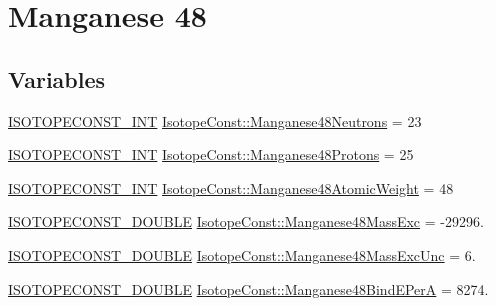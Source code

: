 \hypertarget{group___isotope_const-_manganese-_mn48}{}\section{Manganese 48}
\label{group___isotope_const-_manganese-_mn48}
\subsection*{Variables}
\begin{DoxyCompactItemize}
\item 
\mbox{\hyperlink{group___isotope_const-_macros_ga5f18360b3e99483a35c32d789e62621c}{I\+S\+O\+T\+O\+P\+E\+C\+O\+N\+S\+T\+\_\+\+I\+NT}} \mbox{\hyperlink{group___isotope_const-_manganese-_mn48_ga9c61cfdbcaa1b260fa60e8bf13b518a8}{Isotope\+Const\+::\+Manganese48\+Neutrons}} = 23
\item 
\mbox{\hyperlink{group___isotope_const-_macros_ga5f18360b3e99483a35c32d789e62621c}{I\+S\+O\+T\+O\+P\+E\+C\+O\+N\+S\+T\+\_\+\+I\+NT}} \mbox{\hyperlink{group___isotope_const-_manganese-_mn48_ga281bf9cb6445197a274bcad354de2059}{Isotope\+Const\+::\+Manganese48\+Protons}} = 25
\item 
\mbox{\hyperlink{group___isotope_const-_macros_ga5f18360b3e99483a35c32d789e62621c}{I\+S\+O\+T\+O\+P\+E\+C\+O\+N\+S\+T\+\_\+\+I\+NT}} \mbox{\hyperlink{group___isotope_const-_manganese-_mn48_ga2f5138870bd82c060b2f151cddad07ad}{Isotope\+Const\+::\+Manganese48\+Atomic\+Weight}} = 48
\item 
\mbox{\hyperlink{group___isotope_const-_macros_ga8f45a7272ce02c0b4c65c44636ed719a}{I\+S\+O\+T\+O\+P\+E\+C\+O\+N\+S\+T\+\_\+\+D\+O\+U\+B\+LE}} \mbox{\hyperlink{group___isotope_const-_manganese-_mn48_ga5f792fa20900b72b1d52d566e9ef4909}{Isotope\+Const\+::\+Manganese48\+Mass\+Exc}} = -\/29296.
\item 
\mbox{\hyperlink{group___isotope_const-_macros_ga8f45a7272ce02c0b4c65c44636ed719a}{I\+S\+O\+T\+O\+P\+E\+C\+O\+N\+S\+T\+\_\+\+D\+O\+U\+B\+LE}} \mbox{\hyperlink{group___isotope_const-_manganese-_mn48_ga3f3ef199e16abbb37e51e36fa110fcb4}{Isotope\+Const\+::\+Manganese48\+Mass\+Exc\+Unc}} = 6.
\item 
\mbox{\hyperlink{group___isotope_const-_macros_ga8f45a7272ce02c0b4c65c44636ed719a}{I\+S\+O\+T\+O\+P\+E\+C\+O\+N\+S\+T\+\_\+\+D\+O\+U\+B\+LE}} \mbox{\hyperlink{group___isotope_const-_manganese-_mn48_ga59a1f18f42ae9d2be32c03c393e8764b}{Isotope\+Const\+::\+Manganese48\+Bind\+E\+PerA}} = 8274.
\item 

\end{DoxyCompactItemize}
